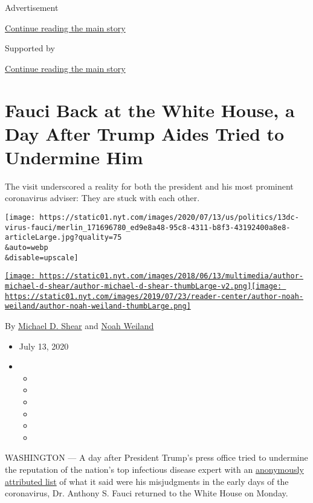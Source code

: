 Advertisement

\protect\hyperlink{after-top}{Continue reading the main story}

Supported by

\protect\hyperlink{after-sponsor}{Continue reading the main story}

\hypertarget{fauci-back-at-the-white-house-a-day-after-trump-aides-tried-to-undermine-him}{%
\section{Fauci Back at the White House, a Day After Trump Aides Tried to
Undermine
Him}\label{fauci-back-at-the-white-house-a-day-after-trump-aides-tried-to-undermine-him}}

The visit underscored a reality for both the president and his most
prominent coronavirus adviser: They are stuck with each other.

\texttt{[image: https://static01.nyt.com/images/2020/07/13/us/politics/13dc-virus-fauci/merlin\_171696780\_ed9e8a48-95c8-4311-b8f3-43192400a8e8-articleLarge.jpg?quality=75\\\&auto=webp\\\&disable=upscale]}

\href{https://www.nytimes.com/by/michael-d-shear}{\texttt{[image: https://static01.nyt.com/images/2018/06/13/multimedia/author-michael-d-shear/author-michael-d-shear-thumbLarge-v2.png]}}\href{https://www.nytimes.com/by/noah-weiland}{\texttt{[image: https://static01.nyt.com/images/2019/07/23/reader-center/author-noah-weiland/author-noah-weiland-thumbLarge.png]}}

By \href{https://www.nytimes.com/by/michael-d-shear}{Michael D. Shear}
and \href{https://www.nytimes.com/by/noah-weiland}{Noah Weiland}

\begin{itemize}
\item
  July 13, 2020
\item
  \begin{itemize}
  \item
  \item
  \item
  \item
  \item
  \item
  \end{itemize}
\end{itemize}

WASHINGTON --- A day after President Trump's press office tried to
undermine the reputation of the nation's top infectious disease expert
with an
\href{https://www.nytimes.com/2020/07/12/us/politics/fauci-trump-coronavirus.html}{anonymously
attributed list} of what it said were his misjudgments in the early days
of the coronavirus, Dr. Anthony S. Fauci returned to the White House on
Monday.

